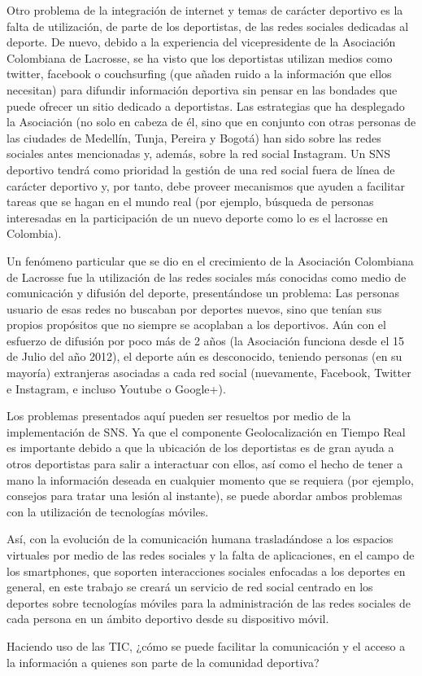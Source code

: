 Otro problema de la integración de internet y temas de carácter deportivo es la falta de utilización, de parte de los deportistas, de las redes sociales dedicadas al deporte. De nuevo, debido a la experiencia del vicepresidente de la Asociación Colombiana de Lacrosse, se ha visto que los deportistas utilizan medios como twitter, facebook o couchsurfing (que añaden ruido a la información que ellos necesitan) para difundir información deportiva sin pensar en las bondades que puede ofrecer un sitio dedicado a deportistas. Las estrategias que ha desplegado la Asociación (no solo en cabeza de él, sino que en conjunto con otras personas de las ciudades de Medellín, Tunja, Pereira y Bogotá) han sido sobre las redes sociales antes mencionadas y, además, sobre la red social Instagram. Un SNS deportivo tendrá como prioridad la gestión de una red social fuera de línea de carácter deportivo y, por tanto, debe proveer mecanismos que ayuden a facilitar tareas que se hagan en el mundo real (por ejemplo, búsqueda de personas interesadas en la participación de un nuevo deporte como lo es el lacrosse en Colombia).

Un fenómeno particular que se dio en el crecimiento de la Asociación Colombiana de Lacrosse fue la utilización de las redes sociales más conocidas como medio de comunicación y difusión del deporte, presentándose un problema: Las personas usuario de esas redes no buscaban por deportes nuevos, sino que tenían sus propios propósitos que no siempre se acoplaban a los deportivos. Aún con el esfuerzo de difusión por poco más de 2 años (la Asociación funciona desde el 15 de Julio del año 2012), el deporte aún es desconocido, teniendo personas (en su mayoría) extranjeras asociadas a cada red social (nuevamente, Facebook, Twitter e Instagram, e incluso Youtube o Google+).

Los problemas presentados aquí pueden ser resueltos por medio de la implementación de SNS. Ya que el componente Geolocalización en Tiempo Real es importante debido a que la ubicación de los deportistas es de gran ayuda a otros deportistas para salir a interactuar con ellos, así como el hecho de tener a mano la información deseada en cualquier momento que se requiera (por ejemplo, consejos para tratar una lesión al instante), se puede abordar ambos problemas con la utilización de tecnologías móviles.

Así, con la evolución de la comunicación humana trasladándose a los espacios virtuales por medio de las redes sociales y la falta de aplicaciones, en el campo de los smartphones, que soporten interacciones sociales enfocadas a los deportes en general, en este trabajo se creará un servicio de red social centrado en los deportes sobre tecnologías móviles para la administración de las redes sociales de cada persona en un ámbito deportivo desde su dispositivo móvil.

Haciendo uso de las TIC, ¿cómo se puede facilitar la comunicación y el acceso a la información a quienes son parte de la comunidad deportiva?
